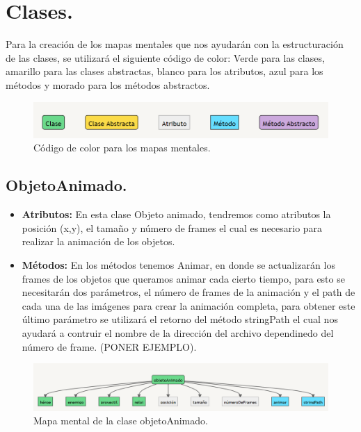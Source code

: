 \documentclass{article}
\begin{document}
\section{Clases.}
Para la creación de los mapas mentales que nos ayudarán con la estructuración de las clases, se utilizará el siguiente código de color: Verde para las clases, amarillo para las clases abstractas, blanco para los atributos, azul para los métodos y morado para los métodos abstractos.

\begin{figure}[h]
\includegraphics[scale=0.8]{Images/colores.png}
\centering
\caption{Código de color para los mapas mentales.}
\label{fig:func1}
\end{figure}

\subsection{ObjetoAnimado.}\label{objeto_animado}
\begin{itemize}
  \item \textbf{Atributos:} En esta clase Objeto animado, tendremos como atributos la posición (x,y), el tamaño y número de frames el cual es necesario para realizar la animación de los objetos.
  
  \item \textbf{Métodos:} En los métodos tenemos Animar, en donde se actualizarán los frames de los objetos que queramos animar cada cierto tiempo, para esto se necesitarán dos parámetros, el número de frames de la animación y el path de cada una de las imágenes para crear la animación completa, para obtener este último parámetro se utilizará el retorno del método stringPath el cual nos ayudará a contruir el nombre de la dirección del archivo dependinedo del número de frame. (PONER EJEMPLO).
\end{itemize}

\begin{figure}[h]
\includegraphics[scale=0.5]{Images/ObjetoAnimado.png}
\centering
\caption{Mapa mental de la clase objetoAnimado.}
\label{fig:func1}
\end{figure}
\end{document}

